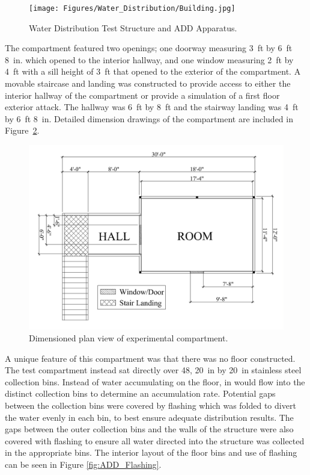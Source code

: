 \documentclass[12pt,oneside]{book}
\begin{document}
\begin{figure}[!ht]
	\centering
	\texttt{[image: Figures/Water\_Distribution/Building.jpg]}
	\caption[Water Distribution Test Structure and ADD Apparatus]{Water Distribution Test Structure and ADD Apparatus.}
	\label{fig:Water_Distribution_Test_Structure_and_ADD_Apparatus}
\end{figure}

The compartment featured two openings; one doorway measuring 3~ft by 6~ft 8~in. which opened to the interior hallway, and one window measuring 2~ft by 4~ft with a sill height of 3~ft that opened to the exterior of the compartment. A movable staircase and landing was constructed to provide access to either the interior hallway of the compartment or provide a simulation of a first floor exterior attack. The hallway was 6~ft by 8~ft and the stairway landing was 4~ft by 6~ft 8~in. Detailed dimension drawings of the compartment are included in Figure~\ref{fig:ADD_Top_View}.

\begin{figure}[!ht]
	\centering
	\includegraphics[width=\columnwidth]{Figures/Water_Distribution/ADDtopdownviewtext}
	\caption[Dimensioned Plan View of Experimental Compartment]{Dimensioned plan view of experimental compartment.}
	\label{fig:ADD_Top_View}
\end{figure}

\clearpage

A unique feature of this compartment was that there was no floor constructed. The test compartment instead sat directly over 48, 20~in by 20~in stainless steel collection bins. Instead of water accumulating on the floor, in would flow into the distinct collection bins to determine an accumulation rate. Potential gaps between the collection bins were covered by flashing which was folded to divert the water evenly in each bin, to best ensure adequate distribution results. The gaps between the outer collection bins and the walls of the structure were also covered with flashing to ensure all water directed into the structure was collected in the appropriate bins. The interior layout of the floor bins and use of flashing can be seen in Figure \ref{fig:ADD_Flashing}. 
\end{document}
